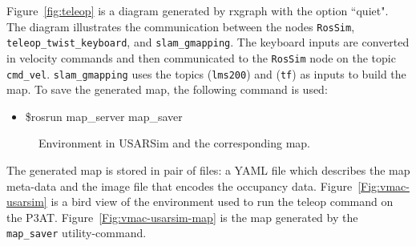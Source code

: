 Figure~\ref{fig:teleop} is a diagram generated by rxgraph with the option ``quiet". The diagram illustrates the communication between the nodes \texttt{RosSim}, \texttt{teleop\_twist\_keyboard}, and \texttt{slam\_gmapping}. The keyboard inputs are converted in velocity commands and then communicated to the \texttt{RosSim} node on the topic \texttt{cmd\_vel}. \texttt{slam\_gmapping} uses the topics (\texttt{lms200}) and (\texttt{tf}) as inputs to build the map. To save the generated map, the following command is used:

\begin{itemize}
\item[]\$rosrun map\_server map\_saver
\end{itemize}

\begin{figure}[t!]
\centering
{}\qquad
{}
\caption{Environment in USARSim and the corresponding map.}
\end{figure}
The generated map is stored in pair of files: a YAML file which describes the map meta-data and the image file that encodes the occupancy data. Figure~\ref{Fig:vmac-usarsim} is a bird view of the environment used to run the teleop command on the P3AT. Figure~\ref{Fig:vmac-usarsim-map} is the map generated by the \texttt{map\_saver} utility-command.






